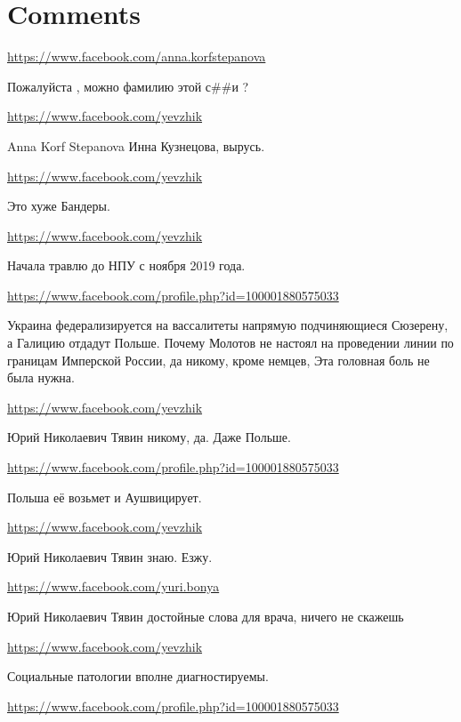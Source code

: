 \documentclass[a4paper,11pt]{extreport}
\begin{document}
\section{Comments}
\begin{itemize}
\url{https://www.facebook.com/anna.korfstepanova}

Пожалуйста , можно фамилию этой с##и ?

\begin{itemize}
\url{https://www.facebook.com/yevzhik}

Anna Korf Stepanova Инна Кузнецова, вырусь.

\url{https://www.facebook.com/yevzhik}

Это хуже Бандеры.

\url{https://www.facebook.com/yevzhik}

Начала травлю до НПУ с ноября 2019 года.

\end{itemize}
\url{https://www.facebook.com/profile.php?id=100001880575033}

Украина федерализируется на вассалитеты напрямую подчиняющиеся Сюзерену, а Галицию отдадут Польше. Почему Молотов не настоял на проведении линии по границам Имперской России, да никому, кроме немцев, Эта головная боль не была нужна.

\begin{itemize}
\url{https://www.facebook.com/yevzhik}

Юрий Николаевич Тявин никому, да. Даже Польше.

\url{https://www.facebook.com/profile.php?id=100001880575033}

Польша её возьмет и Аушвицирует.

\url{https://www.facebook.com/yevzhik}

Юрий Николаевич Тявин знаю. Езжу.

\url{https://www.facebook.com/yuri.bonya}

Юрий Николаевич Тявин достойные слова для врача, ничего не скажешь

\url{https://www.facebook.com/yevzhik}

Социальные патологии вполне диагностируемы.

\url{https://www.facebook.com/profile.php?id=100001880575033}


\end{itemize}
\end{itemize}
\end{document}
